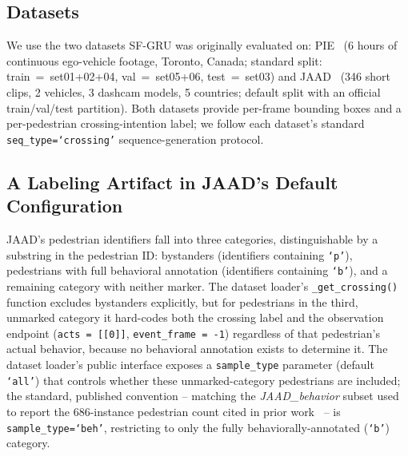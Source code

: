 \subsection{Datasets}
\label{sec:method-data}

We use the two datasets SF-GRU was originally evaluated
on: PIE~\cite{rasouli2019pie} (6 hours of continuous ego-vehicle
footage, Toronto, Canada; standard split: train~=~set01+02+04,
val~=~set05+06, test~=~set03) and
JAAD~\cite{rasouli2017jaad} (346 short clips, 2 vehicles, 3 dashcam
models, 5 countries; default split with an official train/val/test
partition). Both datasets provide per-frame bounding boxes and a
per-pedestrian crossing-intention label; we follow each dataset's
standard \texttt{seq\_type=`crossing'} sequence-generation protocol.

\subsection{A Labeling Artifact in JAAD's Default Configuration}
\label{sec:method-labelbug}

JAAD's pedestrian identifiers fall into three categories, distinguishable
by a substring in the pedestrian ID: bystanders (identifiers containing
\texttt{`p'}), pedestrians with full behavioral annotation
(identifiers containing \texttt{`b'}), and a remaining category with
neither marker. The dataset loader's \texttt{\_get\_crossing()} function
excludes bystanders explicitly, but for pedestrians in the third,
unmarked category it hard-codes both the crossing label and the
observation endpoint (\texttt{acts\,=\,[[0]]},
\texttt{event\_frame\,=\,-1}) regardless of that pedestrian's actual
behavior, because no behavioral annotation exists to determine it. The
dataset loader's public interface exposes a \texttt{sample\_type}
parameter (default \texttt{`all'}) that controls whether these
unmarked-category pedestrians are included; the standard, published
convention -- matching the \emph{JAAD\_behavior} subset used to report
the 686-instance pedestrian count cited in prior
work~\cite{kotseruba2021pcpa} -- is \texttt{sample\_type=`beh'},
restricting to only the fully behaviorally-annotated (\texttt{`b'})
category.

